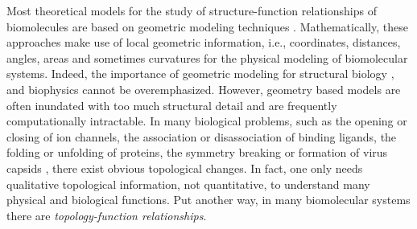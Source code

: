 \documentclass[10pt]{article}
\begin{document}
 Most theoretical models for the study of structure-function  relationships of biomolecules    are    based  on   geometric modeling techniques %
\cite{JLi:2013,DasGupta2016}. Mathematically, these approaches  make use of local  geometric information,  i.e., coordinates, distances, angles, areas %
and sometimes curvatures \cite{DDNguyen:2016c} for the physical modeling of biomolecular systems.   Indeed, the importance of geometric modeling for structural biology \cite{XFeng:2012a},
and  biophysics \cite{XFeng:2013b,KLXia:2014a,PMach:2011} %
cannot be overemphasized. However, geometry based models are often inundated with too much structural detail and  are frequently computationally intractable. In many biological problems, such as the  opening or closing of ion channels, the association or disassociation of binding ligands,  the folding or unfolding of proteins, the symmetry breaking or formation of virus capsids \cite{Twarock:2008},  there exist  obvious topological changes. In fact, one only needs qualitative topological information, not quantitative, to understand many physical and biological functions. Put another way,  in many biomolecular systems there are {\it topology-function relationships}.
\end{document}
